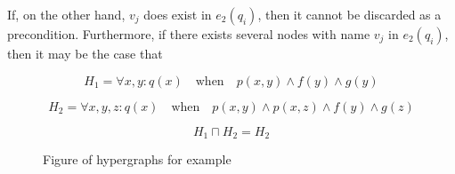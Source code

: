 \documentclass[../Master.tex]{subfiles}
\providecommand{\master}{..}
\begin{document}
If, on the other hand, $v_j$ does exist in $e_2(q_i)$, then it cannot be discarded as a precondition. Furthermore, if there exists several nodes with name $v_j$ in $e_2(q_i)$, then it may be the case that

\begin{example} \label{ex:ca:hgma:generalization}
    \begin{equation*}
        H_1 = \forall x, y : q(x) \quad \text{when} \quad
            p(x,y) \land f(y) \land g(y)
    \end{equation*}

    \begin{equation*}
        H_2 = \forall x, y, z : q(x) \quad \text{when} \quad
            p(x, y) \land p(x,z) \land f(y) \land g(z)
    \end{equation*}

    \begin{equation*}
        H_1 \sqcap H_2 = H_2
    \end{equation*}

    \begin{figure}
        \centering
        \begin{subfigure}[b]{0.4\textwidth}
            \centering
            \resizebox{\linewidth}{!}{}
            \caption{}
            \label{fig:ex:ca:hgma:ex:generalization1}
        \end{subfigure}%
        \hfill%
        \begin{subfigure}[b]{0.4\textwidth}
            \centering
            \resizebox{0.8\linewidth}{!}{}
            \caption{}
            \label{fig:ex:ca:hgma:ex:generalization1}
        \end{subfigure}
        \caption{} Figure of hypergraphs for example
    \end{figure}

\end{example}
\end{document}

